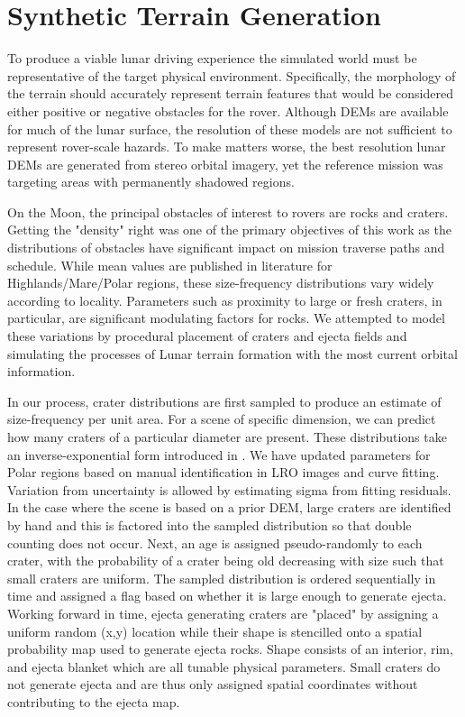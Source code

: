 \documentclass[twocolumn,letterpaper]{IEEEAerospaceCLS}  %
\begin{document}
\section{Synthetic Terrain Generation}

To produce a viable lunar driving experience the simulated world must be representative of the target physical environment. Specifically, the morphology of the terrain should accurately represent terrain features that would be considered either positive or negative obstacles for the rover. Although DEMs are available for much of the lunar surface, the resolution of these models are not sufficient to represent rover-scale hazards. To make matters worse, the best resolution lunar DEMs are generated from stereo orbital imagery, yet the reference mission was targeting areas with permanently shadowed regions. 

On the Moon, the principal obstacles of interest to rovers are rocks and craters. Getting the "density" right was one of the primary objectives of this work as the distributions of obstacles have significant impact on mission traverse paths and schedule. While mean values are published in literature \cite{Surveyor1968} for Highlands/Mare/Polar regions, these size-frequency distributions vary widely according to locality. Parameters such as proximity to large or fresh craters, in particular, are significant modulating factors for rocks. We attempted to model these variations by procedural placement of craters and ejecta fields and simulating the processes of Lunar terrain formation with the most current orbital information. 

In our process, crater distributions are first sampled to produce an estimate of size-frequency per unit area. For a scene of specific dimension, we can predict how many craters of a particular diameter are present. These distributions take an inverse-exponential form introduced in \cite{Surveyor1968}. We have updated parameters for Polar regions based on manual identification in LRO images and curve fitting. Variation from uncertainty is allowed by estimating sigma from fitting residuals. In the case where the scene is based on a prior DEM, large craters are identified by hand and this is factored into the sampled distribution so that double counting does not occur. Next, an age is assigned pseudo-randomly to each crater, with the probability of a crater being old decreasing with size such that small craters are uniform. The sampled distribution is ordered sequentially in time and assigned a flag based on whether it is large enough to generate ejecta. Working forward in time, ejecta generating craters are "placed" by assigning a uniform random (x,y) location while their shape is stencilled onto a spatial probability map used to generate ejecta rocks. Shape consists of an interior, rim, and ejecta blanket which are all tunable physical parameters. Small craters do not generate ejecta and are thus only assigned spatial coordinates without contributing to the ejecta map.           
\end{document}
